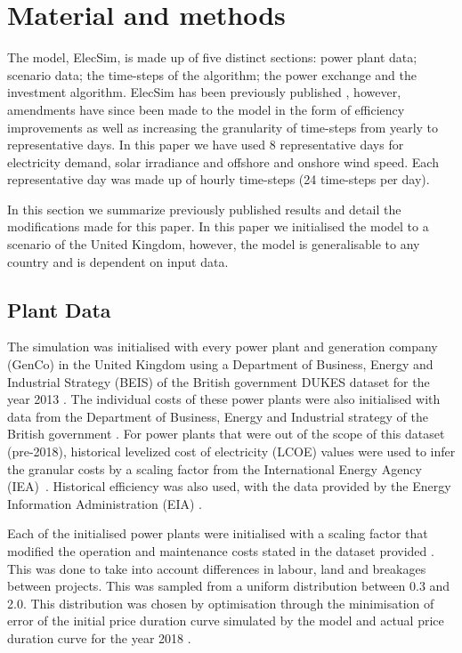 \documentclass[final,3p,times,twocolumn,numbers]{elsarticle}
\begin{document}
\section{Material and methods}
\label{sec:methods}

The model, ElecSim, is made up of five distinct sections: power plant data; scenario data; the time-steps of the algorithm; the power exchange and the investment algorithm. ElecSim has been previously published \cite{Kell}, however, amendments have since been made to the model in the form of efficiency improvements as well as increasing the granularity of time-steps from yearly to representative days. In this paper we have used 8 representative days for electricity demand, solar irradiance and offshore and onshore wind speed. Each representative day was made up of hourly time-steps (24 time-steps per day).

In this section we summarize previously published results and detail the modifications made for this paper. In this paper we initialised the model to a scenario of the United Kingdom, however, the model is generalisable to any country and is dependent on input data.

\subsection{Plant Data}

The simulation was initialised with every power plant and generation company (GenCo) in the United Kingdom using a Department of Business, Energy and Industrial Strategy (BEIS) of the British government DUKES dataset for the year 2013 \cite{dukes_511}. The individual costs of these power plants were also initialised with data from the Department of Business, Energy and Industrial strategy of the British government \cite{Department2016}. For power plants that were out of the scope of this dataset (pre-2018), historical levelized cost of electricity (LCOE) values were used to infer the granular costs by a scaling factor from the International Energy Agency (IEA)~\cite{IEA2015}. Historical efficiency was also used, with the data provided by the Energy Information Administration (EIA) \cite{eia_efficiency}. 

Each of the initialised power plants were initialised with a scaling factor that modified the operation and maintenance costs stated in the dataset provided \cite{Department2016}. This was done to take into account differences in labour, land and breakages between projects. This was sampled from a uniform distribution between 0.3 and 2.0. This distribution was chosen by optimisation through the minimisation of error of the initial price duration curve simulated by the model and actual price duration curve for the year 2018 \cite{Kell}.
\end{document}
